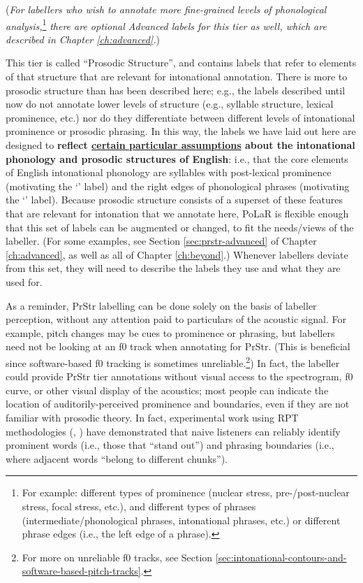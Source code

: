 \documentclass[11pt, twoside]{memoir}
\def\polar#1{{\relsize{-.5}\fontspec[Mapping=tex-text]{Roboto Mono}{#1}}}
\def\polarquot#1{‘\polar{#1}’}
\begin{document}
(\textit{For labellers who wish to annotate more fine-grained levels of phonological analysis,}\footnote{For example: different types of prominence (nuclear stress, pre-\slash post-nuclear stress, focal stress, etc.), and different types of phrases (intermediate\slash phonological phrases, intonational phrases, etc.) or different phrase edges (i.e., the left edge of a phrase).} \textit{there are optional Advanced labels for this tier as well, which are described in Chapter \ref{ch:advanced}.})

\begin{infobox}[frametitle=\textbf{A side-note about this tier}]
This tier is called “Prosodic Structure”, and contains labels that refer to elements of that structure that are relevant for intonational annotation. There is more to prosodic structure than has been described here; e.g., the labels described until now do not annotate lower levels of structure (e.g., syllable structure, lexical prominence, etc.) nor do they differentiate between different levels of intonational prominence or prosodic phrasing. In this way, the labels we have laid out here are designed to \textbf{reflect \uline{certain particular assumptions} about the intonational phonology and prosodic structures of English}: i.e., that the core elements of English intonational phonology are syllables with post-lexical prominence (motivating the \polarquot{*} label) and the right edges of phonological phrases (motivating the \polarquot{]} label). Because prosodic structure consists of a superset of these features that are relevant for intonation that we annotate here, PoLaR is flexible enough that this set of labels can be augmented or changed, to fit the needs\slash views of the labeller. (For some examples, see Section \ref{sec:prstr-advanced} of Chapter \ref{ch:advanced}, as well as all of Chapter \ref{ch:beyond}.) Whenever labellers deviate from this set, they will need to describe the labels they use and what they are used for.
\end{infobox}

As a reminder, PrStr labelling can be done solely on the basis of labeller perception, without any attention paid to particulars of the acoustic signal. For example, pitch changes may be cues to prominence or phrasing, but labellers need not be looking at an f0 track when annotating for PrStr. (This is beneficial since software-based f0 tracking is sometimes unreliable.\footnote{For more on unreliable f0 tracks, see Section \ref{sec:intonational-contours-and-software-based-pitch-tracks}.}) In fact, the labeller could provide PrStr tier annotations without visual access to the spectrogram, f0 curve, or other visual display of the acoustics; most people can indicate the location of auditorily-perceived prominence and boundaries, even if they are not familiar with prosodic theory. In fact, experimental work using RPT methodologies (\citealt{cole-14, cole-17}, \citealt{cole-16}) have demonstrated that naive listeners can reliably identify prominent words (i.e., those that “stand out”) and phrasing boundaries (i.e., where adjacent words “belong to different chunks”).
\end{document}

